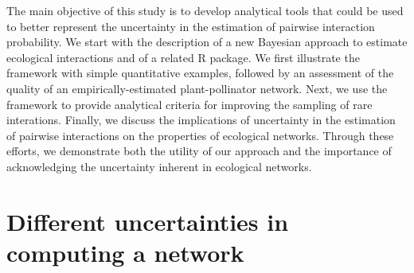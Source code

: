 \documentclass[12pt]{article}
\begin{document}
    The main objective of this study is to develop analytical tools that could be used to better represent the uncertainty in the estimation of pairwise interaction probability. We start with the description of a new Bayesian approach to estimate ecological interactions and of a related R package. We first illustrate the framework with simple quantitative examples, followed by an assessment of the quality of an empirically-estimated plant-pollinator network. Next, we use the framework to provide analytical criteria for improving the sampling of rare interations. Finally, we discuss the implications of uncertainty in the estimation of pairwise interactions on the properties of ecological networks. Through these efforts, we demonstrate both the utility of our approach and the importance of acknowledging the uncertainty inherent in ecological networks.







\section*{Different uncertainties in computing a network}
\end{document}
